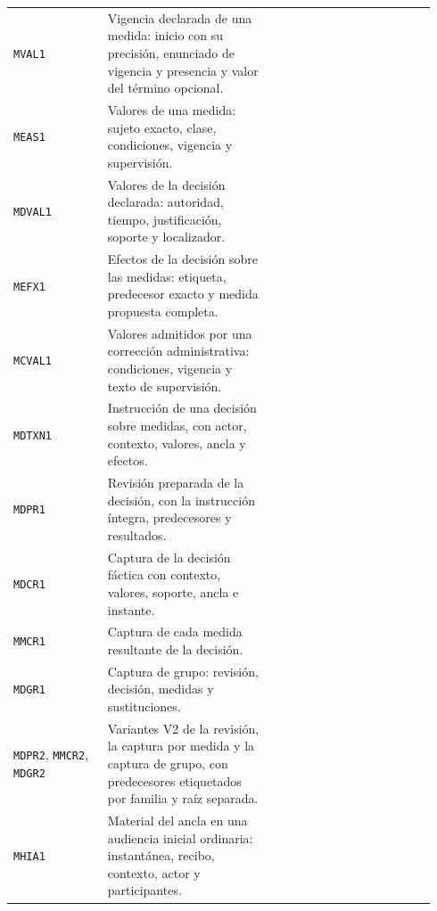 \begin{longtable}{@{}L{0.21\linewidth}L{0.37\linewidth}L{0.36\linewidth}@{}}
  \texttt{MVAL1} & Vigencia declarada de una medida: inicio con su precisión, enunciado de vigencia y presencia y valor del término opcional. &  \\
  \texttt{MEAS1} & Valores de una medida: sujeto exacto, clase, condiciones, vigencia y supervisión. &  \\
  \texttt{MDVAL1} & Valores de la decisión declarada: autoridad, tiempo, justificación, soporte y localizador. &  \\
  \texttt{MEFX1} & Efectos de la decisión sobre las medidas: etiqueta, predecesor exacto y medida propuesta completa. &  \\
  \texttt{MCVAL1} & Valores admitidos por una corrección administrativa: condiciones, vigencia y texto de supervisión. &  \\
  \texttt{MDTXN1} & Instrucción de una decisión sobre medidas, con actor, contexto, valores, ancla y efectos. &  \\
  \texttt{MDPR1} & Revisión preparada de la decisión, con la instrucción íntegra, predecesores y resultados. &  \\
  \texttt{MDCR1} & Captura de la decisión fáctica con contexto, valores, soporte, ancla e instante. &  \\
  \texttt{MMCR1} & Captura de cada medida resultante de la decisión. &  \\
  \texttt{MDGR1} & Captura de grupo: revisión, decisión, medidas y sustituciones. &  \\
  \texttt{MDPR2}, \texttt{MMCR2}, \texttt{MDGR2} & Variantes V2 de la revisión, la captura por medida y la captura de grupo, con predecesores etiquetados por familia y raíz separada. &  \\
  \texttt{MHIA1} & Material del ancla en una audiencia inicial ordinaria: instantánea, recibo, contexto, actor y participantes. &  \\

\end{longtable}
